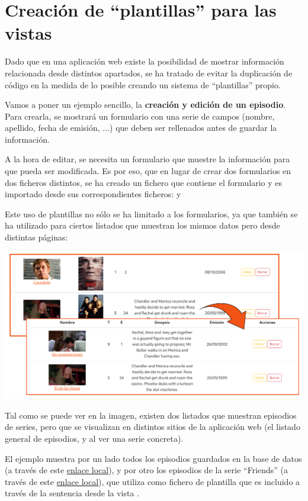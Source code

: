 \documentclass{\ClassPath/viu-tfm-template}
\begin{document}
\section{Creación de “plantillas” para las vistas}
Dado que en una aplicación web existe la posibilidad de mostrar información relacionada desde distintos apartados, se ha tratado de evitar la duplicación de código en la medida de lo posible creando un sistema de “plantillas” propio.

Vamos a poner un ejemplo sencillo, la \textbf{creación y edición de un episodio}. Para crearla, se mostrará un  formulario con una serie de campos (nombre, apellido, fecha de emisión, ...) que deben ser rellenados antes de guardar la información.

A la hora de editar, se necesita un formulario que muestre la información para que pueda ser modificada. Es por eso, que en lugar de crear dos formularios en dos ficheros distintos, se ha creado un fichero  que contiene el formulario y es importado desde sus correspondientes ficheros:  y 

Este uso de plantillas no sólo se ha limitado a los formularios, ya que también se ha utilizado para ciertos listados que muestran los mismos datos pero desde distintas páginas:
\begin{center}
    \includegraphics[width=0.8\linewidth]{img/vistas.png}
\end{center}
\vspace{-1em}

Tal como se puede ver en la imagen, existen dos listados que muestran episodios de series, pero que se visualizan en distintos sitios de la aplicación web (el listado general de episodios, y al ver una serie concreta).

El ejemplo muestra por un lado todos los episodios guardados en la base de datos (a través de este \href{http://localhost/views/episodes/}{enlace local}), y por otro los episodios de la serie “Friends” (a través de este \href{http://localhost/views/tvshows/show.php?id=4}{enlace local}), que utiliza como fichero de plantilla   que es incluido a través de la sentencia  desde la vista .
\end{document}
